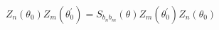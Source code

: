\begin{equation}
Z_{n}(\theta _{0})Z_{m}(\theta _{0}^{\prime })=S_{b_{n}b_{m}}(\theta
)Z_{m}(\theta _{0}^{\prime })Z_{n}(\theta _{0})
\end{equation}%
